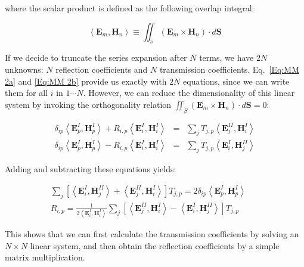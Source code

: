 where the scalar product is defined as the following overlap integral:

\begin{equation} 
\left\langle \mathbf{E}_{m},\mathbf{H}_{n}\right\rangle \equiv \iint _{s}\left( \mathbf{E}_{m}\times \mathbf{H}_{n}\right) \cdot d{\mathbf S}
\end{equation} 

If we decide to truncate the series expansion after $N$ terms, we have
$2N$ unknowns: $N$ reflection coefficients and $N$ transmission
coefficients. Eq.~\ref{Eq:MM 2a} and \ref{Eq:MM 2b} provide us exactly with
$2N$ equations, since we can write them for all $i$ in $1 \cdots N$.
However, we can reduce the dimensionality of this linear system by invoking
the orthogonality relation $\iint_{S}\left( \mathbf{E}_{m}\times \mathbf{H}_{n}\right) \cdot d{\mathbf S}=0$:

\begin{eqnarray}
\delta _{ip}\left\langle \mathbf{E}^{I}_{p},\mathbf{H}^{I}_{p}\right\rangle +R_{i,p}\left\langle \mathbf{E}^{I}_{i},\mathbf{H}^{I}_{i}\right\rangle  & = & \sum _{j}T_{j,p}\left\langle \mathbf{E}^{II}_{j},\mathbf{H}^{I}_{i}\right\rangle \label{Eq:MM 3a} \\
\delta _{ip}\left\langle \mathbf{E}^{I}_{p},\mathbf{H}^{I}_{p}\right\rangle -R_{i,p}\left\langle \mathbf{E}^{I}_{i},\mathbf{H}^{I}_{i}\right\rangle  & = & \sum _{j}T_{j,p}\left\langle \mathbf{E}^{I}_{i},\mathbf{H}^{II}_{j}\right\rangle \label{Eq:MM 3b} 
\end{eqnarray}

Adding and subtracting these equations yields:

\begin{eqnarray}
\sum _{j}\left[ \left\langle \mathbf{E}^{I}_{i},\mathbf{H}^{II}_{j}\right\rangle +\left\langle \mathbf{E}^{II}_{j},\mathbf{H}^{I}_{i}\right\rangle \right] T_{j,p}=2\delta _{ip}\left\langle \mathbf{E}^{I}_{p},\mathbf{H}^{I}_{p}\right\rangle  &  & \label{Eq:MM 4a} \\
R_{i,p}=\frac{1}{2\left\langle \mathbf{E}^{I}_{i},\mathbf{H}^{I}_{i}\right\rangle }\sum _{j}\left[ \left\langle \mathbf{E}^{II}_{j},\mathbf{H}^{I}_{i}\right\rangle -\left\langle \mathbf{E}^{I}_{i},\mathbf{H}^{II}_{j}\right\rangle \right] T_{j,p} &  & \label{Eq:MM 4b} 
\end{eqnarray}

This shows that we can first calculate the transmission coefficients by solving
an $N \times N$ linear system, and then obtain the reflection coefficients
by a simple matrix multiplication.

